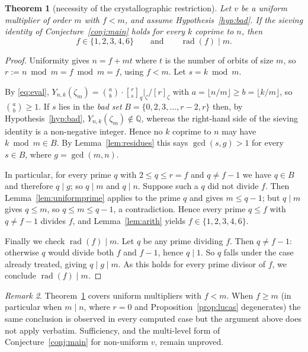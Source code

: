 \documentclass[11pt,a4paper]{article}
\theoremstyle{plain}
\newtheorem{theorem}{Theorem}[section]
\theoremstyle{definition}
\theoremstyle{remark}
\newtheorem{remark}[theorem]{Remark}
\newcommand{\Q}{\mathbb{Q}}
\newcommand{\qbin}[2]{\genfrac[]{0pt}{}{#1}{#2}_{q}}
\newcommand{\rad}{\operatorname{rad}}
\begin{document}
\begin{theorem}[necessity of the crystallographic restriction]\label{thm:necessity}
Let $v$ be a uniform multiplier of order $m$ with $f<m$, and assume
Hypothesis~\ref{hyp:bad}. If the sieving identity of Conjecture~\ref{conj:main} holds for
every $k$ coprime to $n$, then
\[
  f\in\{1,2,3,4,6\}\qquad\text{and}\qquad \rad(f)\mid m .
\]
\end{theorem}

\begin{proof}
Uniformity gives $n=f+mt$ where $t$ is the number of orbits of size $m$, so
$r:=n\bmod m=f\bmod m=f$, using $f<m$. Let $s=k\bmod m$.

By \eqref{eq:eval}, $Y_{n,k}(\zeta_m)=\binom{a}{b}\cdot
\qbin{r}{s}|_{\zeta}/[r]_\zeta$ with $a=\lfloor n/m\rfloor\ge b=\lfloor k/m\rfloor$, so
$\binom{a}{b}\ge1$. If $s$ lies in the \emph{bad set}
$B=\{0,2,3,\dots,r-2,r\}$ then, by Hypothesis~\ref{hyp:bad}, $Y_{n,k}(\zeta_m)\notin\Q$,
whereas the right-hand side of the sieving identity is a non-negative integer. Hence no
$k$ coprime to $n$ may have $k\bmod m\in B$. By Lemma~\ref{lem:residues} this says
$\gcd(s,g)>1$ for every $s\in B$, where $g=\gcd(m,n)$.

In particular, for every prime $q$ with $2\le q\le r=f$ and $q\ne f-1$ we have $q\in B$ and
therefore $q\mid g$; so $q\mid m$ and $q\mid n$. Suppose such a $q$ did not divide $f$. Then
Lemma~\ref{lem:uniformprime} applies to the prime $q$ and gives $m\le q-1$; but $q\mid m$
gives $q\le m$, so $q\le m\le q-1$, a contradiction. Hence every prime $q\le f$ with
$q\ne f-1$ divides $f$, and Lemma~\ref{lem:arith} yields $f\in\{1,2,3,4,6\}$.

Finally we check $\rad(f)\mid m$. Let $q$ be any prime dividing $f$. Then $q\ne f-1$:
otherwise $q$ would divide both $f$ and $f-1$, hence $q\mid1$. So $q$ falls under the case
already treated, giving $q\mid g\mid m$. As this holds for every prime divisor of $f$, we
conclude $\rad(f)\mid m$.
\end{proof}

\begin{remark}
Theorem~\ref{thm:necessity} covers uniform multipliers with $f<m$. When $f\ge m$ (in
particular when $m\mid n$, where $r=0$ and Proposition~\ref{prop:lucas} degenerates) the
same conclusion is observed in every computed case but the argument above does not apply
verbatim. Sufficiency, and the multi-level form of Conjecture~\ref{conj:main} for
non-uniform $v$, remain unproved.
\end{remark}
\end{document}
